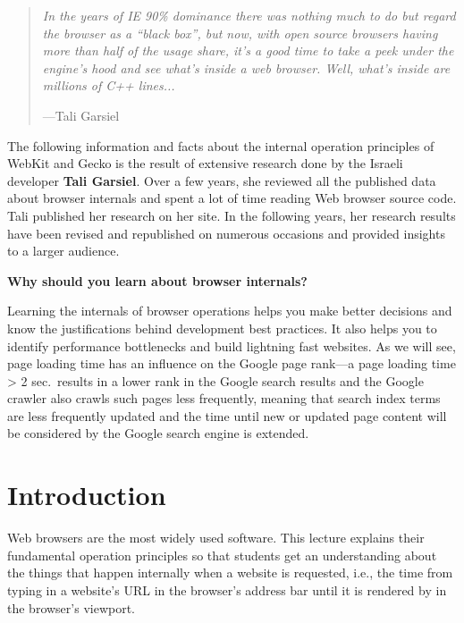 \documentclass[a4paper, justified, notoc]{tufte-handout} %
\begin{document}
\begin{quote}
	\emph{In the years of IE 90\% dominance there was nothing much to do but regard the browser as a ``black box'', but now, with open source browsers having more than half of the usage share, it's a good time to take a peek under the engine's hood and see what's inside a web browser. Well, what's inside are millions of C++ lines...}\begin{flushright}\vspace{-1em}---Tali Garsiel \end{flushright}
\end{quote}

The following information and facts about the internal operation principles of WebKit and Gecko is the result of extensive research done by the Israeli developer \textbf{Tali Garsiel}. Over a few years, she reviewed all the published data about browser internals and spent a lot of time reading Web browser source code. Tali published her research on her site. In the following years, her research results have been revised and republished on numerous occasions and provided insights to a larger audience. 

\textbf{Why should you learn about browser internals?}

Learning the internals of browser operations helps you make better decisions and know the justifications behind development best practices. It also helps you to identify performance bottlenecks and build lightning fast websites. As we will see, page loading time has an influence on the Google page rank---a page loading time > 2 sec.\ results in a lower rank in the Google search results and the Google crawler also crawls such pages less frequently, meaning that  search index terms are less frequently updated and the time until new or updated page content will be considered by the Google search engine is extended.   










\section{Introduction}\label{sec:introduction}

Web browsers are the most widely used software.
This lecture explains their fundamental operation principles so that students get an understanding about the things that happen internally when a website is requested, i.e., the time from typing in a website's URL in the browser's address bar until it is rendered by in the browser's viewport.
\end{document}

